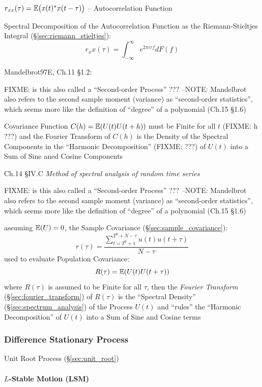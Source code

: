 $r_{xx}(\tau) = \mathbb{E}\big(x(t)^* x(t - \tau)\big)$ -- Autocorrelation Function

Spectral Decomposition of the Autocorrelation Function as the Riemann-Stieltjes
Integral (\S\ref{sec:riemann_stieltjes}):
\[
  r_xx(\tau) = \int_{-\infty}^\infty e^{2\pi i\tau f} dF(f)
\]

Mandelbrot97E, Ch.11 \S 1.2:

FIXME: is this also called a ``Second-order Process'' ???
--NOTE: Mandelbrot also refers to the second sample moment (variance) as
``second-order statistics'', which seems more like the definition of ``degree''
of a polynomial (Ch.15 \S 1.6)

Covariance Function $C(h) = \mathbb{E}(U(t) U(t + h))$ must be Finite for all $t$
(FIXME: h ???) and the Fourier Transform of $C(h)$ is the Density of the
Spectral Components in the ``Harmonic Decomposition'' (FIXME: ???) of $U(t)$
into a Sum of Sine aned Cosine Components

Ch.14 \S IV.C \emph{Method of spectral analysis of random time series}

FIXME: is this also called a ``Second-order Process'' ???
--NOTE: Mandelbrot also refers to the second sample moment (variance) as
``second-order statistics'', which seems more like the definition of ``degree''
of a polynomial (Ch.15 \S 1.6)

assuming $\mathbb{E}(U) = 0$, the Sample Covariance
(\S\ref{sec:sample_covariance}):
\[
  r(\tau) = \frac{\sum_{t = T^0 + 1}^{T^0 + N - \tau} u(t) u(t + \tau)}
    {N - \tau}
\]
used to evaluate Population Covariance:
\[
  R(\tau) = \mathbb{E}(U(t) U(t + \tau))
\]
where $R(\tau)$ is assumed to be Finite for all $\tau$, then the \emph{Fourier
Transform} (\S\ref{sec:fourier_transform}) of $R(\tau)$ is the ``Spectral
Density'' (\S\ref{sec:spectrum_analysis}) of the Process $U(t)$ and ``rules''
the ``Harmonic Decomposition'' of $U(t)$ into a Sum of Sine and Cosine terms



\subsubsection{Difference Stationary Process}\label{sec:difference_stationary}

Unit Root Process (\S\ref{sec:unit_root})



\paragraph{$L$-Stable Motion (LSM)}\label{sec:lsm}\hfill

